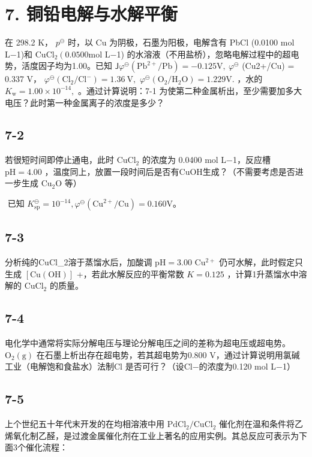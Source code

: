 \section*{7. 铜铅电解与水解平衡}
在 298.2 K， $p ^ { \ominus }$ 时，以 Cu 为阴极，⽯墨为阳极，电解含有 PbCl (0.0100 mol L−1)和 $\mathrm { C u C l _ { 2 } } \left( 0 . 0 5 0 0 \mathrm { m o l } \right.$ L−1) 的⽔溶液（不⽤盐桥），忽略电解过程中的超电势，活度因⼦均为1.00。已知 $\mathsf { J } \varphi ^ { \ominus } ( \mathrm { P b ^ { 2 + } } / \mathrm { P b } ) = - 0 . 1 2 5 \mathrm { V } , \ \varphi ^ { \ominus }$ (Cu2+/Cu) = 0.337 V， $\varphi ^ { \ominus } ( \mathrm { C l _ { 2 } } / \mathrm { C l ^ { - } } ) = 1 . 3 6 ~ \mathrm { V } ,$ $\varphi ^ { \ominus } ( \mathrm { O _ { 2 } / H _ { 2 } O } ) = 1 . 2 2 9 \mathrm { V } .$ ，⽔的 $K _ { \mathrm { w } } = 1 . 0 0 \times 1 0 ^ { - 1 4 } \mathrm { , }$ 。通过计算说明：7-1 为使第⼆种⾦属析出，⾄少需要加多⼤电压？此时第⼀种⾦属离⼦的浓度是多少？

\subsection*{7-2}
若很短时间即停⽌通电，此时 $\mathrm { C u C l _ { 2 } }$ 的浓度为 0.0400 mol L−1，反应槽 $\mathrm { p H } = 4 . 0 0 $ ，温度同上，放置⼀段时间后是否有CuOH⽣成？（不需要考虑是否进⼀步⽣成 $\mathrm { C u _ { 2 } O }$ 等）

$
\text { 已知 } K _ {\mathrm{sp}} ^ {\ominus} = 1 0 ^ {- 1 4}, \varphi^ {\ominus} (\mathrm{Cu} ^ {2 +} / \mathrm{Cu}) = 0. 1 6 0 \mathrm{V} 。
$

\subsection*{7-3}
分析纯的CuCl_{2}溶于蒸馏⽔后，加酸调 $\mathrm { p H } = 3 . 0 0$ $\mathrm { C u ^ { 2 + } }$ 仍可⽔解，此时假定只⽣成 $\mathrm { [ C u ( O H ) ] }$ +，若此⽔解反应的平衡常数 $K = 0 . 1 2 5$ ，计算1升蒸馏⽔中溶解的 $\mathrm { C u C l _ { 2 } }$ 的质量。

\subsection*{7-4}
电化学中通常将实际分解电压与理论分解电压之间的差称为超电压或超电势。 $\mathrm { O _ { 2 } ( g ) }$ 在⽯墨上析出存在超电势，若其超电势为0.800 V，通过计算说明⽤氯碱⼯业（电解饱和⻝盐⽔）法制Cl 是否可⾏？（设Cl−的浓度为0.120 mol L−1）

\subsection*{7-5}
上个世纪五⼗年代末开发的在均相溶液中⽤ $\mathrm { P d C l _ { 2 } / C u C l _ { 2 } }$ 催化剂在温和条件将⼄烯氧化制⼄醛，是过渡⾦属催化剂在⼯业上著名的应⽤实例。其总反应可表⽰为下⾯3个催化流程：


